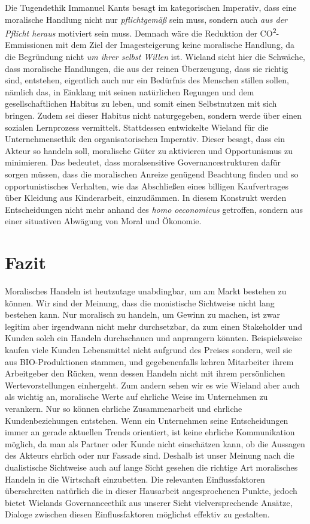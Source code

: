 \documentclass[12pt]{article}
\begin{document}
Die Tugendethik Immanuel Kants besagt im kategorischen Imperativ, dass eine moralische Handlung nicht nur \textit{pflichtgemäß} sein muss, sondern auch \textit{aus der Pflicht heraus} motiviert sein muss. Demnach wäre die Reduktion der CO\textsuperscript{2}-Emmissionen mit dem Ziel der Imagesteigerung keine moralische Handlung, da die Begründung nicht \textit{um ihrer selbst Willen} ist. Wieland sieht hier die Schwäche, dass moralische Handlungen, die aus der reinen Überzeugung, dass sie richtig sind, entstehen, eigentlich auch nur ein Bedürfnis des Menschen stillen sollen, nämlich das, in Einklang mit seinen natürlichen Regungen und dem gesellschaftlichen Habitus zu leben, und somit einen Selbstnutzen mit sich bringen. Zudem sei dieser Habitus nicht naturgegeben, sondern werde über einen sozialen Lernprozess vermittelt. Stattdessen entwickelte Wieland für die Unternehmensethik den organisatorischen Imperativ. Dieser besagt, dass ein Akteur so handeln soll, moralische Güter zu aktivieren und Opportunismus zu minimieren. Das bedeutet, dass moralsensitive Governancestrukturen dafür sorgen müssen, dass die moralischen Anreize genügend Beachtung finden und so opportunistisches Verhalten, wie das Abschließen eines billigen Kaufvertrages über Kleidung aus Kinderarbeit, einzudämmen. In diesem Konstrukt werden Entscheidungen nicht mehr anhand des \textit{homo oeconomicus} getroffen, sondern aus einer situativen Abwägung von Moral und Ökonomie.

\part{Fazit}
Moralisches Handeln ist heutzutage unabdingbar, um am Markt bestehen zu können. Wir sind der Meinung, dass die monistische Sichtweise nicht lang bestehen kann. Nur moralisch zu handeln, um Gewinn zu machen, ist zwar legitim aber irgendwann nicht mehr durchsetzbar, da zum einen Stakeholder und Kunden solch ein Handeln durchschauen und anprangern könnten. Beispielsweise kaufen viele Kunden Lebensmittel nicht aufgrund des Preises sondern, weil sie aus BIO-Produktionen stammen, und gegebenenfalls kehren Mitarbeiter ihrem Arbeitgeber den Rücken, wenn dessen Handeln nicht mit ihrem persönlichen Wertevorstellungen einhergeht. Zum andern sehen wir es wie Wieland aber auch als wichtig an, moralische Werte auf ehrliche Weise im Unternehmen zu verankern. Nur so können ehrliche Zusammenarbeit und ehrliche Kundenbeziehungen entstehen. Wenn ein Unternehmen seine Entscheidungen immer an gerade aktuellen Trends orientiert, ist keine ehrliche Kommunikation möglich, da man als Partner oder Kunde nicht einschätzen kann, ob die Aussagen des Akteurs ehrlich oder nur Fassade sind. Deshalb ist unser Meinung nach die dualistische Sichtweise auch auf lange Sicht gesehen die richtige Art moralisches Handeln in die Wirtschaft einzubetten. Die relevanten Einflussfaktoren überschreiten natürlich die in dieser Hausarbeit angesprochenen Punkte, jedoch bietet Wielands Governanceethik aus unserer Sicht vielversprechende Ansätze, Dialoge zwischen diesen Einflussfaktoren möglichst effektiv zu gestalten.


\clearpage
\frontmatter%
\renewcommand{\plaintitle}{Literaturverzeichnis}
\setcounter{page}{3}
\printMyBibliography
\end{document}
